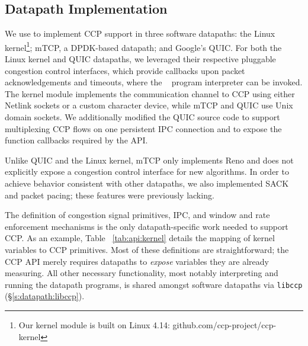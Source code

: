 \subsection{Datapath Implementation}
\label{s:datapath:software_datapaths}
We use  to implement CCP support in three software datapaths: the Linux kernel\footnote{Our kernel module is built on Linux 4.14: github.com/ccp-project/ccp-kernel}; mTCP, a DPDK-based datapath; and Google's QUIC.
For both the Linux kernel and QUIC datapaths, we leveraged their respective pluggable congestion control interfaces, which provide callbacks upon packet acknowledgements and timeouts, where the ~ program interpreter can be invoked.
The kernel module implements the communication channel to CCP using either Netlink sockets or a custom
character device, while mTCP and QUIC use Unix domain sockets.
We additionally modified the QUIC source code to support multiplexing CCP flows on one persistent IPC connection and to expose the function callbacks required by the  API.

Unlike QUIC and the Linux kernel, mTCP only implements Reno and does not explicitly expose a congestion control interface for new algorithms. 
In order to achieve behavior consistent with other datapaths, we also implemented SACK and packet pacing; these features were previously lacking.
%

The definition of congestion signal primitives, IPC, and window and rate enforcement mechanisms is the only datapath-specific work needed to support CCP.
As an example, Table ~\ref{tab:api:kernel} details the mapping of kernel variables to CCP primitives.
Most of these definitions are straightforward; the CCP API merely requires datapaths to \textit{expose} variables they are already measuring.
All other necessary functionality, most notably interpreting and running the datapath programs, is shared amongst software datapaths via \texttt{libccp} (\S\ref{s:datapath:libccp}).

